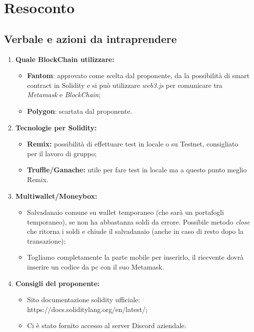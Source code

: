 \section{Resoconto}
\subsection{Verbale e azioni da intraprendere}

\begin{enumerate}
	\item \textbf{Quale BlockChain\glo{} utilizzare:}
	\begin{itemize}
		\item \textbf{Fantom\glo{}}: approvato come scelta dal proponente, da la possibilità di smart contract\glo{} in Solidity\glo{} e si può utilizzare \textit{web3.js}\glo{} per comunicare tra \textit{Metamask}\glo{} e \textit{BlockChain}\glo{};
		\item \textbf{Polygon\glo{}}: scartata dal proponente.
	\end{itemize}
	\item \textbf{Tecnologie per Solidity\glo{}:}
	\begin{itemize}
		\item \textbf{Remix\glo{}:} possibilità di effettuare test in locale o su Testnet, consigliato per il lavoro di gruppo;
		\item \textbf{Truffle\glo/Ganache\glo{}:} utile per fare test in locale ma a questo punto meglio Remix\glo{}.
	\end{itemize}
	\item \textbf{Multiwallet/Moneybox\glo{}:} 
	\begin{itemize}
		\item Salvadanaio comune su wallet temporaneo (che sarà un portafogli temporaneo), se non ha abbastanza soldi da errore. Possibile metodo \textit{close} che ritorna i soldi e chiude il salvadanaio (anche in caso di resto dopo la transazione);
		\item Togliamo completamente la parte mobile per inserirlo, il ricevente dovrà inserire un codice da pc con il suo Metamask\glo{}.
	\end{itemize}
	\item \textbf{Consigli del proponente:}
	\begin{itemize}
		\item Sito documentazione solidity\glo{} ufficiale: https://docs.soliditylang.org/en/latest/;
		\item Ci è stato fornito accesso al server Discord\glo{} aziendale.
	\end{itemize}
	
\end{enumerate}

